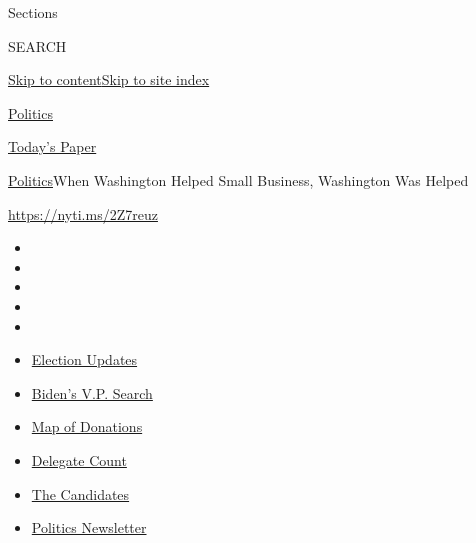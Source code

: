 Sections

SEARCH

\protect\hyperlink{site-content}{Skip to
content}\protect\hyperlink{site-index}{Skip to site index}

\href{https://www.nytimes.com/section/politics}{Politics}

\href{https://myaccount.nytimes.com/auth/login?response_type=cookie\&client_id=vi}{}

\href{https://www.nytimes.com/section/todayspaper}{Today's Paper}

\href{/section/politics}{Politics}\textbar{}When Washington Helped Small
Business, Washington Was Helped

\url{https://nyti.ms/2Z7reuz}

\begin{itemize}
\item
\item
\item
\item
\item
\end{itemize}

\begin{itemize}
\item
  \href{https://www.nytimes.com/2020/07/31/us/elections/biden-vs-trump.html?action=click\&pgtype=Article\&state=default\&region=TOP_BANNER\&context=storylines_menu}{Election
  Updates}
\item
  \href{https://www.nytimes.com/article/biden-vice-president-2020.html?action=click\&pgtype=Article\&state=default\&region=TOP_BANNER\&context=storylines_menu}{Biden's
  V.P. Search}
\item
  \href{https://www.nytimes.com/interactive/2020/07/24/us/politics/trump-biden-campaign-donors.html?action=click\&pgtype=Article\&state=default\&region=TOP_BANNER\&context=storylines_menu}{Map
  of Donations}
\item
  \href{https://www.nytimes.com/interactive/2020/us/elections/delegate-count-primary-results.html?action=click\&pgtype=Article\&state=default\&region=TOP_BANNER\&context=storylines_menu}{Delegate
  Count}
\item
  \href{https://www.nytimes.com/interactive/2019/us/politics/2020-presidential-candidates.html?action=click\&pgtype=Article\&state=default\&region=TOP_BANNER\&context=storylines_menu}{The
  Candidates}
\item
  \href{https://www.nytimes.com/newsletters/politics?action=click\&pgtype=Article\&state=default\&region=TOP_BANNER\&context=storylines_menu}{Politics
  Newsletter}
\end{itemize}

